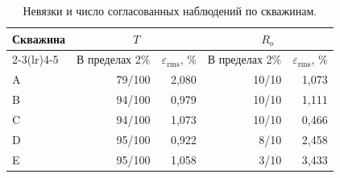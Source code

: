 \begin{table}[htbp]
\centering\small
\renewcommand{\arraystretch}{1.12}
\caption{Невязки и число согласованных наблюдений по скважинам.}\label{tab:wells}
\begin{tabular}{lrrrr}
\toprule
\multirow{2}{*}{Скважина} & \multicolumn{2}{c}{$T$} & \multicolumn{2}{c}{$R_o$} \\
\cmidrule(lr){2-3}\cmidrule(lr){4-5}
 & В пределах 2\% & $\varepsilon_{\mathrm{rms}}$, \% & В пределах 2\% & $\varepsilon_{\mathrm{rms}}$, \% \\
\midrule
A & 79/100 & 2,080 & 10/10 & 1,073 \\
B & 94/100 & 0,979 & 10/10 & 1,111 \\
C & 94/100 & 1,073 & 10/10 & 0,466 \\
D & 95/100 & 0,922 & 8/10 & 2,458 \\
E & 95/100 & 1,058 & 3/10 & 3,433 \\
\bottomrule
\end{tabular}
\end{table}
